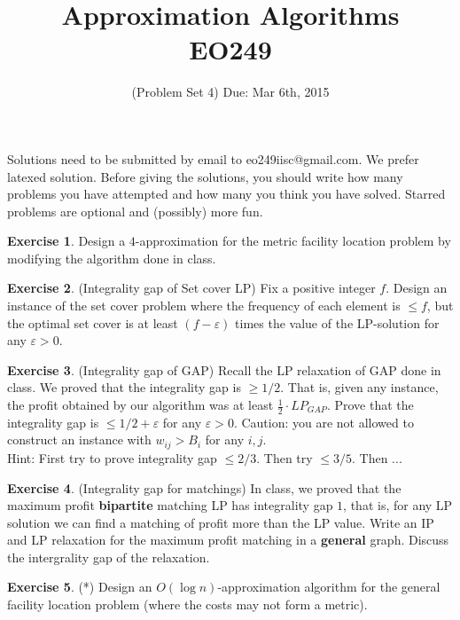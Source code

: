 \documentclass[11pt]{article}
\theoremstyle{definition}
\newtheorem{exercise}{Exercise}
\def\eps{\varepsilon}
\begin{document}
\title{{\bf Approximation Algorithms} \\ 
{\normalsize EO249}}
\date{(Problem Set 4) Due: Mar 6th, 2015}
\maketitle
{\small 
Solutions need to be submitted by email to eo249iisc@gmail.com. We prefer latexed solution. 
Before giving the solutions, you should write how many problems you have attempted and how many you think you have solved.
Starred problems are optional and (possibly) more fun.
}
\vspace{1ex}
\def\poly{\mathrm{poly}}
\begin{exercise}
Design a $4$-approximation for the metric facility location problem by modifying the algorithm done in class.
\end{exercise}
\vspace{1ex}


\begin{exercise}
(Integrality gap of Set cover LP)
Fix a positive integer $f$. Design an instance of the set cover problem where the frequency of each element is $\leq f$,
but the optimal set cover is at least $(f - \eps)$ times the value of the LP-solution for any $\eps > 0$.
\end{exercise}
\vspace{1ex}

\begin{exercise}
(Integrality gap of GAP)
Recall the LP relaxation of GAP done in class. We proved that the integrality gap is $\geq 1/2$. That is, given any instance, the profit obtained by our algorithm was at least $\frac{1}{2}\cdot LP_{GAP}$.
Prove that the integrality gap is $\leq 1/2  + \eps$ for any $\eps> 0$. Caution: you are not allowed to construct an instance with $w_{ij} > B_i$ for any $i,j$.\\
Hint: First try to prove integrality gap $\leq 2/3$. Then try $\leq 3/5$. Then ... 
\end{exercise}
\vspace{1ex}


\begin{exercise}
(Integrality gap for matchings)
In class, we proved that the maximum profit {\bf bipartite} matching LP has integrality gap $1$, that is, for any LP solution we can find a matching of profit more than the LP value.
Write an IP and LP relaxation for the maximum profit matching in a {\bf general} graph. Discuss the intergrality gap of the relaxation.
\end{exercise}
\vspace{1ex}

\begin{exercise}(*)
Design an $O(\log n)$-approximation algorithm for the general facility location problem (where the costs may not form a metric).
\end{exercise}
\end{document}
